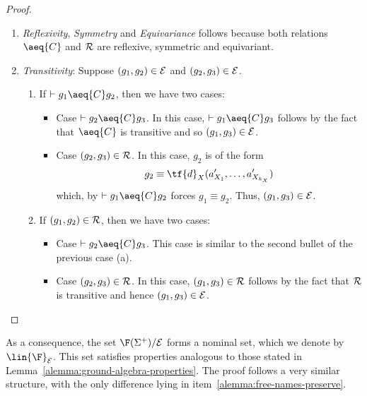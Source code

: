 \begin{proof}
    \begin{enumerate}
        \item {\em Reflexivity}, {\em Symmetry} and {\em Equivariance} follows because both relations $\aeq{C}$ and ${\cal R}$ are reflexive, symmetric and equivariant.

        \item {\em Transitivity}:  Suppose
        $(g_1,g_2)\in {\cal E}$ and $(g_2,g_3)\in {\cal E}$.
        \begin{enumerate}
            \item If$~\vdash g_1\aeq{C} g_2$, then we have two cases:

            \begin{itemize}
                \item Case$~\vdash g_2\aeq{C} g_3$. In this case,$~\vdash g_1\aeq{C} g_3$ follows by the fact that $\aeq{C}$ is transitive and so $(g_1,g_3)\in {\cal E}$.

                \item Case $(g_2,g_3)\in {\cal R}$. In this case, $g_2$ is of the form
                \[
                    g_2 \equiv \tf{d}_X(a_{X_1}',\ldots,a_{X_{k_X}}')
                \]
                which, by$~\vdash g_1\aeq{C} g_2$ forces $g_1 \equiv g_2$. Thus, $(g_1,g_3)\in {\cal E}$.
            \end{itemize}

            \item  If $(g_1,g_2)\in {\cal R}$, then we have two cases:\begin{itemize}
                \item Case$~\vdash g_2\aeq{C} g_3$. This case is similar to the second bullet of the previous case (a).

                \item Case $(g_2,g_3)\in {\cal R}$. In this case, $(g_1,g_3)\in{\cal R}$ follows by the fact that ${\cal R}$ is transitive and hence $(g_1,g_3)\in {\cal E}$.
            \end{itemize}
        \end{enumerate}
    \end{enumerate}
\end{proof}

As a consequence, the set $\F(\Sigma^+)/{{\cal E}}$ forms a nominal set, which we denote by $\lin{\F}_{\cal E}$. This set satisfies properties analogous to those stated in Lemma~\ref{alemma:ground-algebra-properties}. The proof follows a very similar structure, with the only difference lying in item~\ref{alemma:free-names-preserve}.

